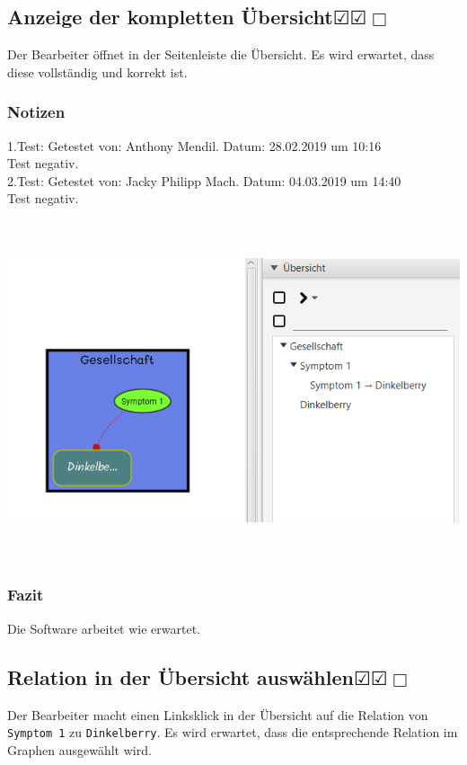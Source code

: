 \documentclass[enabledeprecatedfontcommands]{scrartcl}
\newcommand{\subsectiont}[2]{\subsection[#1]{#1{\normalsize\normalfont #2}}}
\newcommand{\leer}{$\Box$}
\newcommand{\ok}{$\CheckedBox$}
\begin{document}
\subsectiont{Anzeige der kompletten Übersicht}{\dotfill\ok\ok\leer}
Der Bearbeiter öffnet in der Seitenleiste die Übersicht. Es wird erwartet, dass diese vollständig und korrekt ist. 
\subsubsection{Notizen}
1.Test: Getestet von: Anthony Mendil. Datum: 28.02.2019 um 10:16 \\
Test negativ. \\
2.Test: Getestet von: Jacky Philipp Mach. Datum: 04.03.2019 um 14:40 \\
Test negativ.
\begin{center}
\includegraphics[height=10cm]{kompletteUebersicht.PNG}
\end{center}
\subsubsection{Fazit}
Die Software arbeitet wie erwartet.

\subsectiont{Relation in der Übersicht auswählen}{\dotfill\ok\ok\leer}
Der Bearbeiter macht einen Linksklick in der Übersicht auf die Relation von \texttt{Symptom 1} zu \texttt{Dinkelberry}. Es wird erwartet, dass die entsprechende Relation im Graphen ausgewählt wird. 
\end{document}
